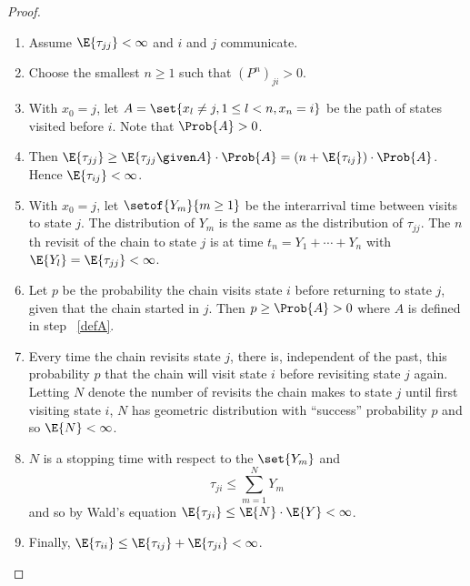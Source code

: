\documentclass[12pt]{article}
\begin{document}
\begin{proof}
    \begin{enumerate}
        \item
            Assume \( \E{\tau_{jj}} < \infty \) and \( i \) and \( j \)
            communicate.
        \item
            Choose the smallest \( n \ge 1 \) such that \( (P^n)_{ji} >
            0 \).
        \item
            \label{defA} With \( x_0 = j \), let \( A = \set{x_l \ne j,
            1 \le l < n, x_n = i} \) be the path of states visited
            before \( i \).  Note that \( \Prob{A} > 0 \).
        \item
            Then \( \E{\tau_{jj}} \ge \E{\tau_{jj} \given A} \cdot \Prob
            {A} = (n + \E{\tau_{ij}}) \cdot \Prob{A} \).  Hence \( \E{\tau_
            {ij}} < \infty \).
        \item
            With \( x_0 = j \), let \( \setof{Y_m}{m \ge 1} \) be the
            interarrival time between visits to state \( j \).  The
            distribution of \( Y_m \) is the same as the distribution of
            \( \tau_{jj} \).  The \( n \)th revisit of the chain to
            state \( j \) is at time \( t_n = Y_1 + \cdots + Y_n \) with
            \( \E{Y_{l}} = \E{\tau_{jj}} < \infty \).
        \item
            Let \( p \) be the probability the chain visits state \( i \)
            before returning to state \( j \), given that the chain
            started in \( j \).  Then \( p \ge \Prob{A} > 0 \) where \(
            A \) is defined in step~%
            \ref{defA}.
        \item
            Every time the chain revisits state \( j \), there is,
            independent of the past, this probability \( p \) that the
            chain will visit state \( i \) before revisiting state \( j \)
            again.  Letting \( N \) denote the number of revisits the
            chain makes to state \( j \) until first visiting state \( i
            \), \( N \) has geometric distribution with ``success''
            probability \( p \) and so \( \E{N} < \infty \).
        \item
            \( N \) is a stopping time with respect to the \( \set{Y_m} \)
            and
            \[
                \tau_{ji} \le \sum\limits_{m=1}^N Y_m
            \] and so by Wald's equation \( \E{\tau_{ji}} \le \E{N}
            \cdot \E{Y} < \infty \).
        \item
            Finally, \( \E{\tau_{ii}} \le \E{\tau_{ij}} + \E{\tau_{ji}}
            < \infty \).
    \end{enumerate}
\end{proof}
\end{document}
